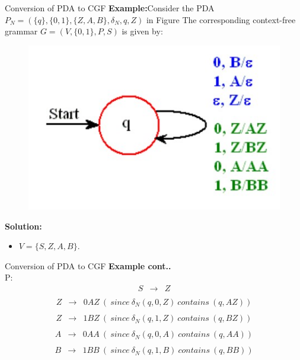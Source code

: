\documentclass{beamer}
\begin{document}
\begin{frame}{Conversion of PDA to CGF}
	\textbf{Example:}Consider the PDA $P_N = (\{q\}, \{0, 1\}, \{Z, A, B\}, \delta_N, q, Z)$ in Figure The corresponding context-free grammar $G = (V, \{0, 1\}, P, S)$ is given by:
	\begin{figure}
		\includegraphics[scale=.5]{img4/m7}
	\end{figure}
\textbf{Solution:}
\begin{itemize}
	\item $V = \{S, Z, A, B\}$.
\end{itemize}
\end{frame}
\begin{frame}{Conversion of PDA to CGF}
	\textbf{Example cont..}\\
	P:
\begin{eqnarray*}
S &\rightarrow& Z \\
\end{eqnarray*}
\begin{eqnarray*}
Z &\rightarrow& 0AZ\  (\ since\  \delta_N (q, 0, Z) \ contains\  (q, AZ)) \\
\end{eqnarray*}
\begin{eqnarray*}
	Z &\rightarrow& 1BZ \ (\ since\  \delta_N (q, 1, Z) \ contains\  (q, BZ)) \\
\end{eqnarray*}
\begin{eqnarray*}
	A &\rightarrow& 0AA \ (\ since\  \delta_N (q, 0, A) \ contains\  (q, AA)) \\
\end{eqnarray*}
\begin{eqnarray*}
	B &\rightarrow& 1BB\  (\ since\  \delta_N (q, 1, B) \ contains\  (q, BB)) \\
\end{eqnarray*}

\end{frame}
\end{document}
